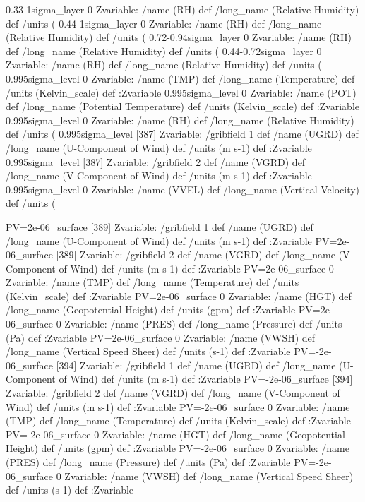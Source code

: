 \begin{ingrid}

0.33-1sigma_layer 0 Zvariable: /name (RH) def /long_name (Relative Humidity) def /units (%
0.44-1sigma_layer 0 Zvariable: /name (RH) def /long_name (Relative Humidity) def /units (%
0.72-0.94sigma_layer 0 Zvariable: /name (RH) def /long_name (Relative Humidity) def /units (%
0.44-0.72sigma_layer 0 Zvariable: /name (RH) def /long_name (Relative Humidity) def /units (%
0.995sigma_level 0 Zvariable: /name (TMP) def /long_name (Temperature) def /units (Kelvin_scale) def :Zvariable
0.995sigma_level 0 Zvariable: /name (POT) def /long_name (Potential Temperature) def /units (Kelvin_scale) def :Zvariable
0.995sigma_level 0 Zvariable: /name (RH) def /long_name (Relative Humidity) def /units (%
0.995sigma_level [387] Zvariable: /gribfield 1 def /name (UGRD) def /long_name (U-Component of Wind) def /units (m s-1) def :Zvariable
0.995sigma_level [387] Zvariable: /gribfield 2 def /name (VGRD) def /long_name (V-Component of Wind) def /units (m s-1) def :Zvariable
0.995sigma_level 0 Zvariable: /name (VVEL) def /long_name (Vertical Velocity) def /units (%

\end{ingrid}
\begin{ingrid}

PV=2e-06_surface [389] Zvariable: /gribfield 1 def /name (UGRD) def /long_name (U-Component of Wind) def /units (m s-1) def :Zvariable
PV=2e-06_surface [389] Zvariable: /gribfield 2 def /name (VGRD) def /long_name (V-Component of Wind) def /units (m s-1) def :Zvariable
PV=2e-06_surface 0 Zvariable: /name (TMP) def /long_name (Temperature) def /units (Kelvin_scale) def :Zvariable
PV=2e-06_surface 0 Zvariable: /name (HGT) def /long_name (Geopotential Height) def /units (gpm) def :Zvariable
PV=2e-06_surface 0 Zvariable: /name (PRES) def /long_name (Pressure) def /units (Pa) def :Zvariable
PV=2e-06_surface 0 Zvariable: /name (VWSH) def /long_name (Vertical Speed Sheer) def /units (s-1) def :Zvariable
PV=-2e-06_surface [394] Zvariable: /gribfield 1 def /name (UGRD) def /long_name (U-Component of Wind) def /units (m s-1) def :Zvariable
PV=-2e-06_surface [394] Zvariable: /gribfield 2 def /name (VGRD) def /long_name (V-Component of Wind) def /units (m s-1) def :Zvariable
PV=-2e-06_surface 0 Zvariable: /name (TMP) def /long_name (Temperature) def /units (Kelvin_scale) def :Zvariable
PV=-2e-06_surface 0 Zvariable: /name (HGT) def /long_name (Geopotential Height) def /units (gpm) def :Zvariable
PV=-2e-06_surface 0 Zvariable: /name (PRES) def /long_name (Pressure) def /units (Pa) def :Zvariable
PV=-2e-06_surface 0 Zvariable: /name (VWSH) def /long_name (Vertical Speed Sheer) def /units (s-1) def :Zvariable

\end{ingrid}
